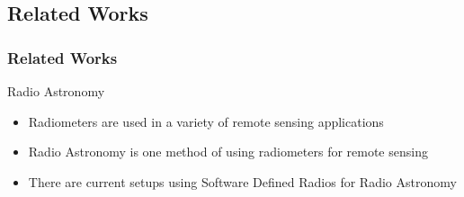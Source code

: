 \documentclass{beamer}
\begin{document}
\subsection{Related Works}
\begin{frame}
\frametitle{Related Works}
\begin{block}{Radio Astronomy}
\begin{itemize}
\item Radiometers are used in a variety of remote sensing applications
\item Radio Astronomy is one method of using radiometers for remote sensing
\item There are current setups using Software Defined Radios for Radio Astronomy
\end{itemize}
\end{block}

\end{frame}
\end{document}
